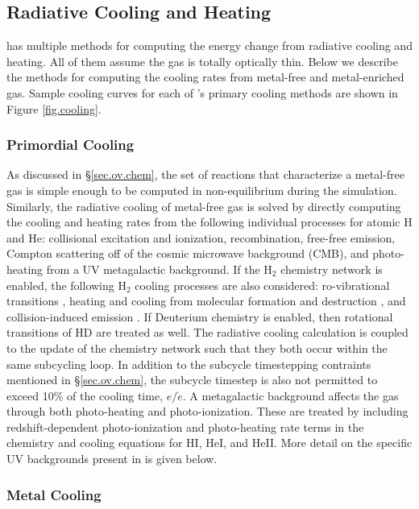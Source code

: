 \subsection{Radiative Cooling and Heating}
\label{sec.num.cooling}

\enzo has multiple methods for computing the energy change from
radiative cooling and heating.  All of them assume the gas is totally
optically thin.  Below we describe the methods for computing the
cooling rates from metal-free and metal-enriched gas.  Sample cooling
curves for each of \enzo's primary cooling methods are shown in Figure
\ref{fig.cooling}.

\subsubsection{Primordial Cooling}

As discussed in \S\ref{sec.ov.chem}, the set of reactions that
characterize a metal-free gas is simple enough to be computed in
non-equilibrium during the simulation.  Similarly, the radiative
cooling of metal-free gas is solved by directly computing the cooling
and heating rates from the following individual processes for atomic
H and He: collisional excitation and ionization, recombination,
free-free emission, Compton scattering off of the cosmic microwave
background (CMB), and photo-heating from a UV metagalactic background.
If the H$_{2}$ chemistry network is enabled, the following H$_{2}$
cooling processes are also considered: ro-vibrational transitions 
\citep{1998A&A...335..403G}, heating and cooling from molecular
formation and destruction \citep{2009Sci...325..601T}, and 
collision-induced emission \citep{2004MNRAS.348.1019R}.  If Deuterium
chemistry is enabled, then rotational transitions of HD
\citep{1998A&A...335..403G} are treated as well.  The radiative
cooling calculation is coupled to the update of the chemistry network
such that they both occur within the same subcycling loop.  In
addition to the subcycle timestepping contraints mentioned in
\S\ref{sec.ov.chem}, the subcycle timestep is also not permitted to
exceed 10\% of the cooling time, $e/\dot{e}$.  A metagalactic
background affects the gas through both photo-heating and
photo-ionization.  These are treated by including redshift-dependent 
photo-ionization and photo-heating rate terms in the chemistry and
cooling equations for HI, HeI, and HeII.  More detail on the specific
UV backgrounds present in \enzo is given below.

\subsubsection{Metal Cooling}



